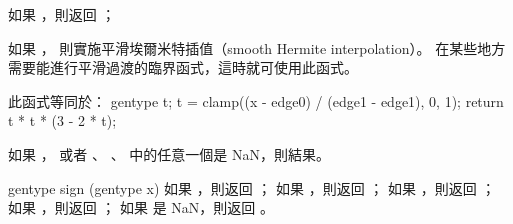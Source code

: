 如果 ，則返回 ；

如果 ，
則實施平滑埃爾米特插值（smooth Hermite interpolation）。
在某些地方需要能進行平滑過渡的臨界函式，這時就可使用此函式。

此函式等同於：
\startcintbl
gentype t;
t = clamp((x - edge0) / (edge1 - edge1), 0, 1);
return t * t * (3 - 2 * t);
\stopcintbl

如果 ，
或者 、 、  中的任意一個是 NaN，則結果。
\stopbuffer

gentype sign (gentype x)
\stopbuffer
{}
如果 ，則返回 ；
如果 ，則返回 ；
如果 ，則返回 ；
如果 ，則返回 ；
如果  是 NaN，則返回 。
\stopbuffer

\startCLFD


\stopCLFD

